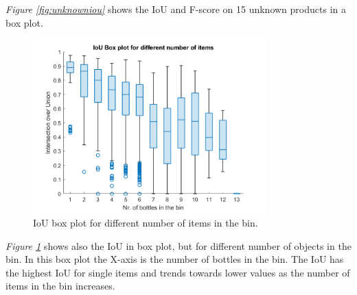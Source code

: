 \textit{Figure \ref{fig:unknowniou}} shows the IoU and F-score on 15 unknown products in a box plot.
\begin{figure}[h]
    \centering
    \includegraphics[width=0.8\textwidth]{graphics/results/boxplotBottles.png}
    \caption{IoU box plot for different number of items in the bin.}
    \label{fig:bottles}
\end{figure}

\textit{Figure \ref{fig:bottles}} shows also the IoU in box plot, but for different number of objects in the bin. In this box plot the X-axis is the number of bottles in the bin. The IoU has the highest IoU for single items and trends towards lower values as the number of items in the bin increases.

